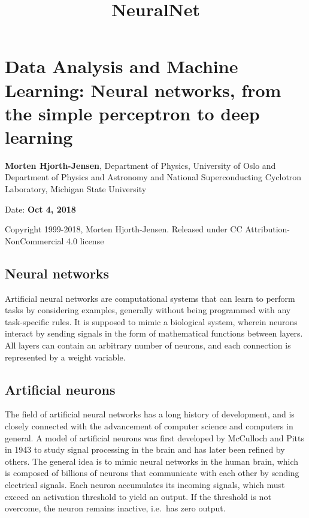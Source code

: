 \documentclass[11pt]{article}
\title{NeuralNet}
\begin{document}
    
    
    \maketitle
    
    

    
    \hypertarget{data-analysis-and-machine-learning-neural-networks-from-the-simple-perceptron-to-deep-learning}{%
\section{Data Analysis and Machine Learning: Neural networks, from the
simple perceptron to deep
learning}\label{data-analysis-and-machine-learning-neural-networks-from-the-simple-perceptron-to-deep-learning}}

\textbf{Morten Hjorth-Jensen}, Department of Physics, University of Oslo
and Department of Physics and Astronomy and National Superconducting
Cyclotron Laboratory, Michigan State University

Date: \textbf{Oct 4, 2018}

Copyright 1999-2018, Morten Hjorth-Jensen. Released under CC
Attribution-NonCommercial 4.0 license

\hypertarget{neural-networks}{%
\subsection{Neural networks}\label{neural-networks}}

Artificial neural networks are computational systems that can learn to
perform tasks by considering examples, generally without being
programmed with any task-specific rules. It is supposed to mimic a
biological system, wherein neurons interact by sending signals in the
form of mathematical functions between layers. All layers can contain an
arbitrary number of neurons, and each connection is represented by a
weight variable.

\hypertarget{artificial-neurons}{%
\subsection{Artificial neurons}\label{artificial-neurons}}

The field of artificial neural networks has a long history of
development, and is closely connected with the advancement of computer
science and computers in general. A model of artificial neurons was
first developed by McCulloch and Pitts in 1943 to study signal
processing in the brain and has later been refined by others. The
general idea is to mimic neural networks in the human brain, which is
composed of billions of neurons that communicate with each other by
sending electrical signals. Each neuron accumulates its incoming
signals, which must exceed an activation threshold to yield an output.
If the threshold is not overcome, the neuron remains inactive, i.e.~has
zero output.
\end{document}
